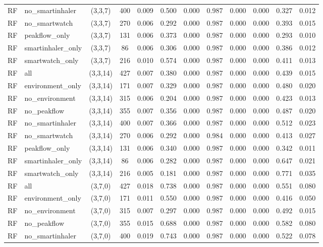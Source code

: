 \begin{longtable}{llcccccccccc}
RF & no\_smartinhaler & (3,3,7) & 400 & 0.009 & 0.500 & 0.000 & 0.987 & 0.000 & 0.000 & 0.327 & 0.012 \\
RF & no\_smartwatch & (3,3,7) & 270 & 0.006 & 0.292 & 0.000 & 0.987 & 0.000 & 0.000 & 0.393 & 0.015 \\
RF & peakflow\_only & (3,3,7) & 131 & 0.006 & 0.373 & 0.000 & 0.987 & 0.000 & 0.000 & 0.293 & 0.010 \\
RF & smartinhaler\_only & (3,3,7) & 86 & 0.006 & 0.306 & 0.000 & 0.987 & 0.000 & 0.000 & 0.386 & 0.012 \\
RF & smartwatch\_only & (3,3,7) & 216 & 0.010 & 0.574 & 0.000 & 0.987 & 0.000 & 0.000 & 0.411 & 0.013 \\
RF & all & (3,3,14) & 427 & 0.007 & 0.380 & 0.000 & 0.987 & 0.000 & 0.000 & 0.439 & 0.015 \\
RF & environment\_only & (3,3,14) & 171 & 0.007 & 0.329 & 0.000 & 0.987 & 0.000 & 0.000 & 0.480 & 0.020 \\
RF & no\_environment & (3,3,14) & 315 & 0.006 & 0.204 & 0.000 & 0.987 & 0.000 & 0.000 & 0.423 & 0.013 \\
RF & no\_peakflow & (3,3,14) & 355 & 0.007 & 0.356 & 0.000 & 0.987 & 0.000 & 0.000 & 0.487 & 0.020 \\
RF & no\_smartinhaler & (3,3,14) & 400 & 0.007 & 0.366 & 0.000 & 0.987 & 0.000 & 0.000 & 0.512 & 0.023 \\
RF & no\_smartwatch & (3,3,14) & 270 & 0.006 & 0.292 & 0.000 & 0.984 & 0.000 & 0.000 & 0.413 & 0.027 \\
RF & peakflow\_only & (3,3,14) & 131 & 0.006 & 0.340 & 0.000 & 0.987 & 0.000 & 0.000 & 0.342 & 0.011 \\
RF & smartinhaler\_only & (3,3,14) & 86 & 0.006 & 0.282 & 0.000 & 0.987 & 0.000 & 0.000 & 0.647 & 0.021 \\
RF & smartwatch\_only & (3,3,14) & 216 & 0.005 & 0.181 & 0.000 & 0.987 & 0.000 & 0.000 & 0.771 & 0.035 \\
RF & all & (3,7,0) & 427 & 0.018 & 0.738 & 0.000 & 0.987 & 0.000 & 0.000 & 0.551 & 0.080 \\
RF & environment\_only & (3,7,0) & 171 & 0.011 & 0.550 & 0.000 & 0.987 & 0.000 & 0.000 & 0.416 & 0.050 \\
RF & no\_environment & (3,7,0) & 315 & 0.007 & 0.297 & 0.000 & 0.987 & 0.000 & 0.000 & 0.492 & 0.015 \\
RF & no\_peakflow & (3,7,0) & 355 & 0.015 & 0.688 & 0.000 & 0.987 & 0.000 & 0.000 & 0.582 & 0.080 \\
RF & no\_smartinhaler & (3,7,0) & 400 & 0.019 & 0.743 & 0.000 & 0.987 & 0.000 & 0.000 & 0.522 & 0.078 \\

\end{longtable}
